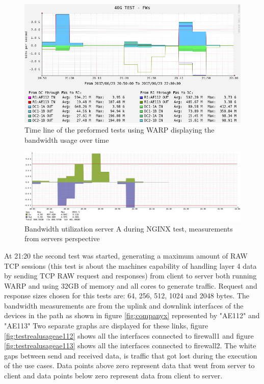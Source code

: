 \begin{figure}[H]
  \includegraphics[scale=0.5]{images/warp-timeline.png}
  \caption{Time line of the preformed tests using WARP displaying the bandwidth usage over time}
  \label{fig:warptime}
\end{figure}

\begin{figure}[H]
  \includegraphics[scale=0.35]{images/real-nginx.png}
  \caption{Bandwidth utilization server A during NGINX test, measurements from servers perspective }
  \label{fig:realnginx}
\end{figure}


At 21:20 the second test was started, generating a maximum amount of RAW TCP sessions (this test is about the machines capability of handling layer 4 data by sending TCP RAW request and responses) from client to server both running WARP and using 32GB of memory and all cores to generate traffic.
Request and response sizes chosen for this tests are: 64, 256, 512, 1024 and 2048 bytes. 
The bandwidth measurements are from the uplink and downlink interfaces of the devices in the path as shown in figure \ref{fig:companyx} represented by "AE112" and "AE113"
Two separate graphs are displayed for these links, figure \ref{fig:testrealusageae112} shows all the interfaces connected to firewall1 and figure \ref{fig:testrealusageae113} shows all the interfaces connected to firewall2.
The white gaps between send and received data, is traffic that got lost during the execution of the use cases. 
Data points above zero represent data that went from server to client and data points below zero represent data from client to server.  
 
